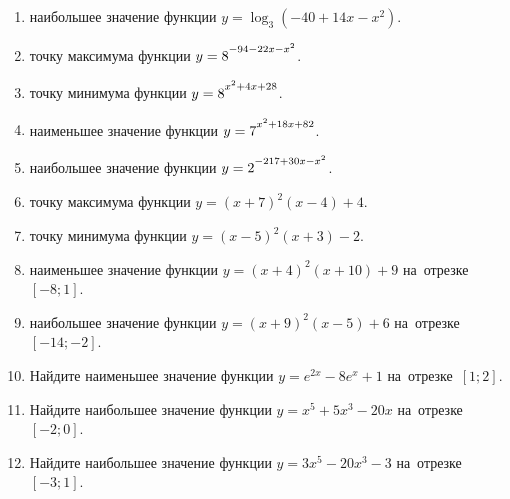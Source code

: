 \documentclass[a4paper,10pt]{article}
\begin{document}
\begin{enumerate}
\item {} наибольшее значение функции $y=\log_3\left(-40+14x-x^2\right)$.

\item {} точку максимума функции $y=8\strut^{-94-22x-x^2}$.

\item {} точку минимума функции $y=8\strut^{x^2+4x+28}$.

\item {} наименьшее значение функции $y=7\strut^{x^2+18x+82}$.

\item {} наибольшее значение функции $y=2\strut^{-217+30x-x^2}$.

\item {} точку максимума функции $y=\left(x+7\right)^2\left(x-4\right)+4$.

\item {} точку минимума функции $y=\left(x-5\right)^2\left(x+3\right)-2$.

\item {} наименьшее значение функции $y=\left(x+4\right)^2\left(x+10\right)+9$ на~отрезке~$\left[-8;1\right]$.

\item {} наибольшее значение функции $y=\left(x+9\right)^2\left(x-5\right)+6$ на~отрезке~$\left[-14;-2\right]$.

\item Найдите наименьшее значение функции $y=e^{2x}-8e^x+1$ на~отрезке~$\left[1;2\right]$.

\item Найдите наибольшее значение функции $y=x^5+5x^3-20x$ на~отрезке~$\left[-2;0\right]$.

\item Найдите наибольшее значение функции $y=3x^5-20x^3-3$ на~отрезке~$\left[-3;1\right]$.

\end{enumerate}
\end{document}
